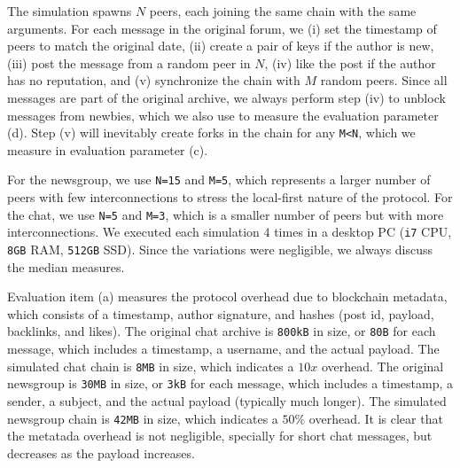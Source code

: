 \documentclass[12pt]{article}
\newcommand{\FC}       {Freechains\xspace}
\newcommand{\code}[1]  {\texttt{\footnotesize{#1}}}
\begin{document}
The simulation spawns $N$ peers, each joining the same chain with the same
arguments.
For each message in the original forum, we
    (i)   set the timestamp of peers to match the original date,
    (ii)  create a pair of keys if the author is new,
    (iii) post the message from a random peer in $N$,
    (iv)  like the post if the author has no reputation, and
    (v)   synchronize the chain with $M$ random peers.
%
Since all messages are part of the original archive, we always perform step
(iv) to unblock messages from newbies, which we also use to measure the
evaluation parameter (d).
Step (v) will inevitably create forks in the chain for any \texttt{M<N}, which
we measure in evaluation parameter (c).

For the newsgroup, we use \texttt{N=15} and \texttt{M=5}, which represents a
larger number of peers with few interconnections to stress the local-first
nature of the protocol.
For the chat, we use \texttt{N=5} and \texttt{M=3}, which is a smaller number
of peers but with more interconnections.
%
We executed each simulation $4$ times in a desktop PC (\texttt{i7} CPU,
\texttt{8GB} RAM, \texttt{512GB} SSD).
Since the variations were negligible, we always discuss the median measures.

Evaluation item (a) measures the protocol overhead due to blockchain metadata,
which consists of a timestamp, author signature, and hashes (post id, payload,
backlinks, and likes).
%
The original chat archive is \texttt{800kB} in size, or \texttt{80B} for each
message, which includes a timestamp, a username, and the actual payload.
The simulated chat chain is \texttt{8MB} in size, which indicates a $10x$
overhead.
The original newsgroup is \texttt{30MB} in size, or \texttt{3kB} for each
message, which includes a timestamp, a sender, a subject, and the actual
payload (typically much longer).
The simulated newsgroup chain is \texttt{42MB} in size, which indicates a
$50\%$ overhead.
%
It is clear that the metatada overhead is not negligible, specially for short
chat messages, but decreases as the payload increases.
\end{document}
